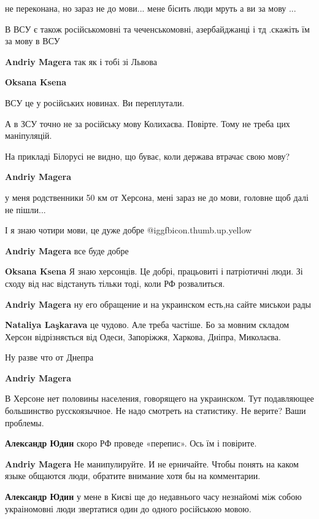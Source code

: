 \begin{itemize}
\begin{itemize}
не переконана, но зараз не до мови... мене бісить люди мруть а ви за мову ...

В ВСУ є також російськомовні та чеченськомовні, азербайджанці і тд .скажіть їм
за мову в ВСУ

\textbf{Andriy Magera} так як і тобі зі Львова

\textbf{Oksana Ksena} 

ВСУ це у російських новинах. Ви переплутали.

А в ЗСУ точно не за російську мову Колихаєва. Повірте. Тому не треба цих
маніпуляцій.

На прикладі Білорусі не видно, що буває, коли держава втрачає свою мову?

\textbf{Andriy Magera} 

у меня родственники 50 км от Херсона, мені зараз не до мови, головне щоб далі не пішли...

І я знаю чотири мови, це дуже добре  @igg{fbicon.thumb.up.yellow} 

\textbf{Andriy Magera} все буде добре

\textbf{Oksana Ksena} Я знаю херсонців. Це добрі, працьовиті і патріотичні люди.
Зі сходу від нас відстануть тільки тоді, коли РФ розвалиться.

\textbf{Andriy Magera} ну его обращение и на украинском есть,на сайте миськои рады

\textbf{Nataliya Laşkarava} це чудово. Але треба частіше. Бо за мовним складом Херсон відрізняється від Одеси, Запоріжжя, Харкова, Дніпра, Миколаєва.

Ну разве что от Днепра

\textbf{Andriy Magera} 

В Херсоне нет половины населения, говорящего на украинском. Тут подавляющее
большинство русскоязычное. Не надо смотреть на статистику. Не верите? Ваши
проблемы.

\textbf{Александр Юдин} скоро РФ проведе «перепис». Ось їм і повірите.

\textbf{Andriy Magera} Не манипулируйте. И не ерничайте. Чтобы понять на каком языке общаются люди, обратите внимание хотя бы на комментарии.

\textbf{Александр Юдин} у мене в Києві ще до недавнього часу незнайомі між собою украіномовні люди звертатися один до одного російською мовою.


\end{itemize}
\end{itemize}
